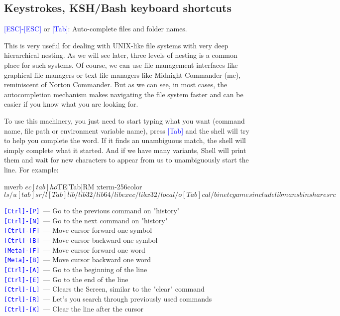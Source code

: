 \documentclass[12pt]{report}
\newcommand{\struct}[1]{\textcolor{blue}{#1}}
\begin{document}
\subsection*{Keystrokes, KSH/Bash keyboard shortcuts}

\struct{[ESC]-[ESC]} or \struct{[Tab]}: Auto-complete files and folder names.

\medskip
This is very useful for dealing with UNIX-like file systems with very
deep hierarchical nesting. As we will see later, three levels of nesting
is a common place for such systems. Of course, we can use file management
interfaces like graphical file managers or text file managers like
Midnight Commander (mc), reminiscent of Norton Commander. But as we can see,
in most cases, the autocompletion mechanism makes navigating the file system
faster and can be easier if you know what you are looking for.

\medskip
To use this machinery, you just need to start typing what you want
(command name, file path or environment variable name), press \struct{[Tab]}
and the shell will try to help you complete the word. If it finds an
unambiguous match, the shell will simply complete what it started. And if
we have many variants, Shell will print them and wait for new characters
to appear from us to unambiguously start the line. For example:
\begin{code}{mverb}
$ ec[tab]ho $TE[Tab]RM
xterm-256color
$ ls /u[tab]sr/l[Tab]
lib/ lib32/ lib64/ libexec/ libx32/ local/ 
o[Tab]cal/
bin etc games include lib man sbin share src
$
\end{code} %

\medskip\noindent
\struct{\tt [Ctrl]-[P]}~--- Go to the previous command on "history"\\
\struct{\tt [Ctrl]-[N]}~--- Go to the next command on "history"\\
\struct{\tt [Ctrl]-[F]}~--- Move cursor forward one symbol\\
\struct{\tt [Ctrl]-[B]}~--- Move cursor backward one symbol\\
\struct{\tt [Meta]-[F]}~--- Move cursor forward one word\\
\struct{\tt [Meta]-[B]}~--- Move cursor backward one word\\
\struct{\tt [Ctrl]-[A]}~--- Go to the beginning of the line\\
\struct{\tt [Ctrl]-[E]}~--- Go to the end of the line\\
\struct{\tt [Ctrl]-[L]}~--- Clears the Screen, similar to the "clear" command\\
\struct{\tt [Ctrl]-[R]}~--- Let’s you search through previously used commands\\
\struct{\tt [Ctrl]-[K]}~--- Clear the line after the cursor
\end{document}

